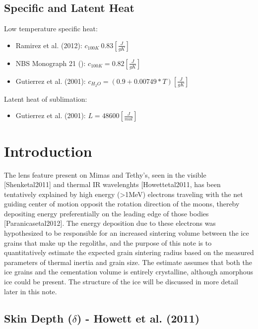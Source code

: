 \documentclass[11pt]{article} %
\begin{document}
\subsection{Specific  and Latent Heat}
\label{sec:sheat}

	Low temperature specific heat:
	
	\begin{itemize}
	\item Ramirez et al. (2012): $c_{100 K} ~ 0.83 [\frac{J}{g K}]$
	\item NBS Monograph 21 (): $c_{100 K} = 0.82 [\frac{J}{g K}]$
	\item Gutierrez et al. (2001): $c_{H_{2}O} = (0.9 + 0.00749 * T) [\frac{J}{g K}]$
	\end{itemize}
	
	Latent heat of sublimation:
	
	\begin{itemize}
	\item Gutierrez et al. (2001): $L = 48600 [\frac{J}{mol}]$
	\end{itemize}

\newpage
\section{Introduction}
\label{sec:intro}

	The lens feature present on Mimas and Tethy's, seen in the visible [Shenketal2011] and thermal IR wavelenghts [Howettetal2011, has been tentatively explained by high energy (>1MeV) electrons traveling with the net guiding center of motion opposit the rotation direction of the moons, thereby depositing energy preferentially on the leading edge of those bodies [Paranicasetal2012]. The energy deposition due to these electrons was hypothesized to be responsible for an increased sintering volume between the ice grains that make up the regoliths, and the purpose of this note is to quantitatively estimate the expected grain sintering radius based on the measured parameters of thermal inertia and grain size. The estimate assumes that both the ice grains and the cementation volume is entirely crystalline, although amorphous ice could be present. The structure of the ice will be discussed in more detail later in this note. 

\subsection{Skin Depth ($\delta$) - Howett et al. (2011)}
\end{document}
